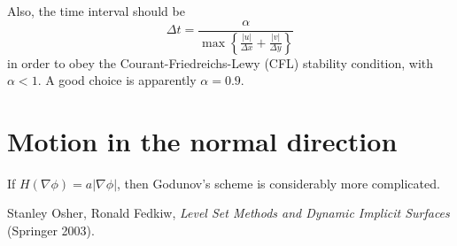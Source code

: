 \documentclass{article}
\newcommand{\be}{\begin{equation}}
\newcommand{\ee}{\end{equation}}
\newcommand{\grad}{\nabla}
\begin{document}
Also, the time interval should be 
\be \Delta t = \frac{\alpha} 
    {\max\left\{\frac{|u|}{\Delta x} + \frac{|v|}{\Delta y} \right\}} \ee
in order to obey the Courant-Friedreichs-Lewy (CFL) stability condition, with $\alpha < 1$. A good choice is apparently $\alpha = 0.9$.

\section{Motion in the normal direction}
If $H(\grad \phi) = a |\grad \phi|$, then Godunov's scheme is considerably more complicated.

\begin{thebibliography}{99}
 Stanley Osher, Ronald Fedkiw, \emph{Level Set Methods and Dynamic Implicit Surfaces} (Springer 2003).
\end{thebibliography}
\end{document}
